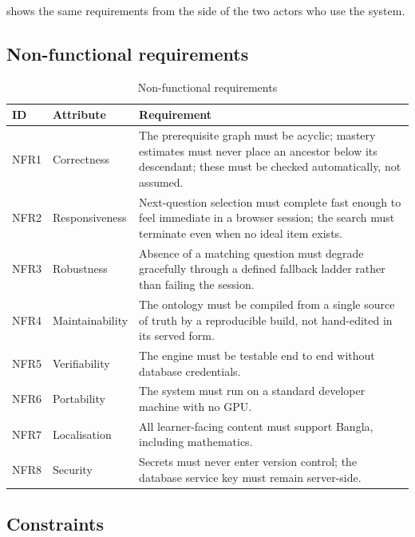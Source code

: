  shows the same requirements from the side of the two
actors who use the system.



\subsection{Non-functional requirements}

\begin{table}[H]
  \singlespacing
  \centering
  \caption{Non-functional requirements}
  \label{tab:nonfunctional}
  \begin{tabularx}{\textwidth}{l>{\hsize}Y>{\hsize}Y}
    \toprule
    ID & Attribute & Requirement \\
    \midrule
    NFR1 & Correctness & The prerequisite graph must be acyclic; mastery estimates must never place an ancestor below its descendant; these must be checked automatically, not assumed. \\
    NFR2 & Responsiveness & Next-question selection must complete fast enough to feel immediate in a browser session; the search must terminate even when no ideal item exists. \\
    NFR3 & Robustness & Absence of a matching question must degrade gracefully through a defined fallback ladder rather than failing the session. \\
    NFR4 & Maintainability & The ontology must be compiled from a single source of truth by a reproducible build, not hand-edited in its served form. \\
    NFR5 & Verifiability & The engine must be testable end to end without database credentials. \\
    NFR6 & Portability & The system must run on a standard developer machine with no GPU. \\
    NFR7 & Localisation & All learner-facing content must support Bangla, including mathematics. \\
    NFR8 & Security & Secrets must never enter version control; the database service key must remain server-side. \\
    \bottomrule
  \end{tabularx}
\end{table}

\subsection{Constraints}

